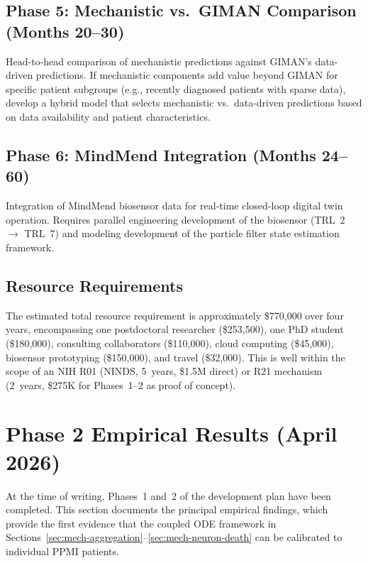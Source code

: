 \subsection{Phase 5: Mechanistic vs.\ GIMAN Comparison (Months 20--30)}

Head-to-head comparison of mechanistic predictions against GIMAN's data-driven predictions. If mechanistic components add value beyond GIMAN for specific patient subgroups (e.g., recently diagnosed patients with sparse data), develop a hybrid model that selects mechanistic vs.\ data-driven predictions based on data availability and patient characteristics.

\subsection{Phase 6: MindMend Integration (Months 24--60)}

Integration of MindMend biosensor data for real-time closed-loop digital twin operation. Requires parallel engineering development of the biosensor (TRL~2 $\to$ TRL~7) and modeling development of the particle filter state estimation framework.

\subsection{Resource Requirements}

The estimated total resource requirement is approximately \$770,000 over four years, encompassing one postdoctoral researcher (\$253,500), one PhD student (\$180,000), consulting collaborators (\$110,000), cloud computing (\$45,000), biosensor prototyping (\$150,000), and travel (\$32,000). This is well within the scope of an NIH R01 (NINDS, 5~years, \$1.5M direct) or R21 mechanism (2~years, \$275K for Phases~1--2 as proof of concept).


\section{Phase 2 Empirical Results (April 2026)}
\label{sec:mech-phase2-results}

At the time of writing, Phases~1 and~2 of the development plan have been completed. This section documents the principal empirical findings, which provide the first evidence that the coupled ODE framework in Sections~\ref{sec:mech-aggregation}--\ref{sec:mech-neuron-death} can be calibrated to individual PPMI patients.

